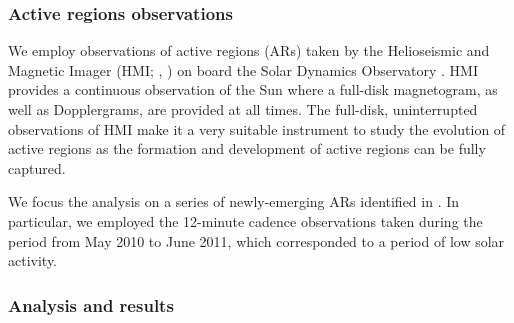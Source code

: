 \documentclass[12pt]{mythesis}
\begin{document}
\subsubsection{Active regions observations}

We employ observations of active regions (ARs) taken by the Helioseismic and Magnetic Imager (HMI; \citealt{hmi1}, \citealt{hmi2}) on board the Solar Dynamics Observatory \citep{SDO}. HMI provides a continuous observation of the Sun where a full-disk magnetogram, as well as Dopplergrams, are provided at all times. The full-disk, uninterrupted observations of HMI make it a very suitable instrument to study the evolution of active regions as the formation and development of active regions can be fully captured. 

We focus the analysis on a series of newly-emerging ARs identified in \citep{toriumi}. In particular, we employed the 12-minute cadence observations taken during the period from May 2010 to June 2011, which corresponded to a period of low solar activity.

\subsubsection{Analysis and results}
\end{document}
